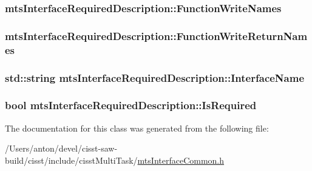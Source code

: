 \subsubsection[{Function\+Write\+Names}]{ mts\+Interface\+Required\+Description\+::\+Function\+Write\+Names}\label{classmts_interface_required_description_ab1a5d3c1ec18381021218a70864088cb}
\hypertarget{classmts_interface_required_description_a3b8f038c5695fa5811879606e9f8de9e}{}
\subsubsection[{Function\+Write\+Return\+Names}]{ mts\+Interface\+Required\+Description\+::\+Function\+Write\+Return\+Names}\label{classmts_interface_required_description_a3b8f038c5695fa5811879606e9f8de9e}
\hypertarget{classmts_interface_required_description_a8ef893e8fc8881d31e85060b9d72fb84}{}
\subsubsection[{Interface\+Name}]{\setlength{\rightskip}{0pt plus 5cm}std\+::string mts\+Interface\+Required\+Description\+::\+Interface\+Name}\label{classmts_interface_required_description_a8ef893e8fc8881d31e85060b9d72fb84}
\hypertarget{classmts_interface_required_description_ae56c8fe1cb63d5e712edb530c6d91f2c}{}
\subsubsection[{Is\+Required}]{\setlength{\rightskip}{0pt plus 5cm}bool mts\+Interface\+Required\+Description\+::\+Is\+Required}\label{classmts_interface_required_description_ae56c8fe1cb63d5e712edb530c6d91f2c}


The documentation for this class was generated from the following file\+:\begin{DoxyCompactItemize}
\item 
/\+Users/anton/devel/cisst-\/saw-\/build/cisst/include/cisst\+Multi\+Task/\hyperlink{mts_interface_common_8h}{mts\+Interface\+Common.\+h}\end{DoxyCompactItemize}
